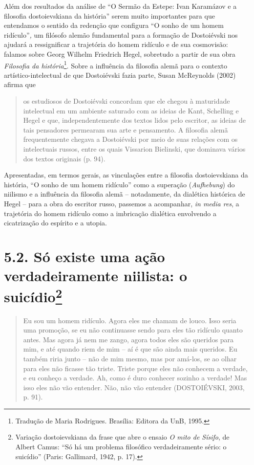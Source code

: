 Além dos resultados da análise de ``O Sermão da Estepe: Ivan Karamázov e
a filosofia dostoievskiana da história'' serem muito importantes para
que entendamos o sentido da redenção que configura ``O sonho de um homem
ridículo''\emph{,} um filósofo alemão fundamental para a formação de
Dostoiévski nos ajudará a ressignificar a trajetória do homem ridículo e
de sua cosmovisão: falamos sobre Georg Wilhelm Friedrich Hegel,
sobretudo a partir de sua obra \emph{Filosofia da história}\footnote{Tradução
  de Maria Rodrigues. Brasília: Editora da UnB, 1995.}. Sobre a
influência da filosofia alemã para o contexto artístico-intelectual de
que Dostoiévski fazia parte, Susan McReynolds (2002) afirma que

\begin{quote}
os estudiosos de Dostoiévski concordam que ele chegou à maturidade
intelectual em um ambiente saturado com as ideias de Kant, Schelling e
Hegel e que, independentemente dos textos lidos pelo escritor, as ideias
de tais pensadores permearam sua arte e pensamento. A filosofia alemã
frequentemente chegava a Dostoiévski por meio de suas relações com os
intelectuais russos, entre os quais Vissarion Bielinski, que dominava
vários dos textos originais (p. 94).
\end{quote}

Apresentadas, em termos gerais, as vinculações entre a filosofia
dostoievskiana da história, ``O sonho de um homem ridículo'' como a
superação (\emph{Aufhebung}) do niilismo e a influência da filosofia
alemã -- notadamente, da dialética histórica de Hegel -- para a obra do
escritor russo, passemos a acompanhar, \emph{in media res}, a trajetória
do homem ridículo como a imbricação dialética envolvendo a cicatrização
do espírito e a utopia.

\section{5.2. Só existe uma ação verdadeiramente niilista: o
suicídio\protect\footnote{Variação dostoievskiana da frase que abre o ensaio
  \emph{O mito de Sísifo}, de Albert Camus: ``Só há um problema
  filosófico verdadeiramente sério: o suicídio'' (Paris: Gallimard,
  1942, p. 17).}}

\begin{quote}
Eu sou um homem ridículo. Agora eles me chamam de louco. Isso seria uma
promoção, se eu não continuasse sendo para eles tão ridículo quanto
antes. Mas agora já nem me zango, agora todos eles são queridos para
mim, e até quando riem de mim -- aí é que são ainda mais queridos. Eu
também riria junto -- não de mim mesmo, mas por amá-los, se ao olhar
para eles não ficasse tão triste. Triste porque eles não conhecem a
verdade, e eu conheço a verdade. Ah, como é duro conhecer sozinho a
verdade! Mas isso eles não vão entender. Não, não vão entender
(DOSTOIÉVSKI, 2003, p. 91).
\end{quote}

